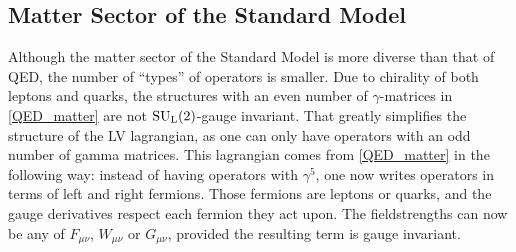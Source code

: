 \documentclass[12pt,preprintnumbers,nofootinbib]{revtex4}
\newcommand{\wt}{\widetilde}
\newcommand{\suc}{{{\rm SU}_{\rm C}(3)}}
\newcommand{\sul}{{{\rm SU}_{\rm L}(2)}}
\begin{document}


\subsection{Matter Sector of the Standard Model}
\label{matter_SM}
	Although the matter sector of the Standard Model is more diverse
	than that of QED, the number of ``types'' of operators is smaller.
	Due to chirality of both leptons and quarks, the structures 
	with an even number of $ \gamma $-matrices in \eqref{QED_matter}
	are not $ \sul $-gauge invariant. 
	That greatly simplifies the structure of the LV lagrangian,
	as one can only have operators with an odd number of gamma
	matrices.
	This lagrangian comes from \eqref{QED_matter} in the following way:
	instead of having operators with $ \gamma^5 $, one now writes
	operators in terms of left and right fermions. 
	Those fermions are leptons or quarks, and the gauge derivatives
	respect each fermion they act upon. 
	The fieldstrengths can now be any of $ F_{\mu\nu} $, 
	$ W_{\mu\nu} $ or $ G_{\mu\nu} $, provided the resulting term
	is gauge invariant. 
	
\end{document}
